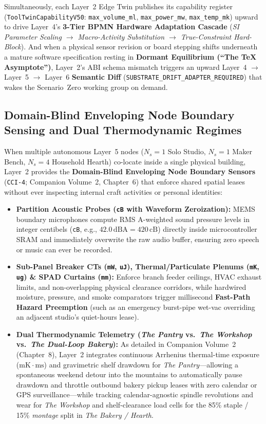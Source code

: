 Simultaneously, each Layer~2 Edge Twin publishes its capability register (\texttt{ToolTwinCapabilityV50}: \texttt{max\_volume\_ml}, \texttt{max\_power\_mw}, \texttt{max\_temp\_mk}) upward to drive Layer~4's \textbf{3-Tier BPMN Hardware Adaptation Cascade} (\textit{SI Parameter Scaling $\to$ Macro-Activity Substitution $\to$ True-Constraint Hard-Block}). And when a physical sensor revision or board stepping shifts underneath a mature software specification resting in \textbf{Dormant Equilibrium (``The \TeX{} Asymptote'')}, Layer~2's ABI schema mismatch triggers an upward Layer~4 $\to$ Layer~5 $\to$ Layer~6 \textbf{Semantic Diff} (\texttt{SUBSTRATE\_DRIFT\_ADAPTER\_REQUIRED}) that wakes the Scenario~Zero working group on demand.

\subsection{Domain-Blind Enveloping Node Boundary Sensing and Dual Thermodynamic Regimes}

When multiple autonomous Layer~5 nodes ($N_s=1$ Solo Studio, $N_s=1$ Maker Bench, $N_s=4$ Household Hearth) co-locate inside a single physical building, Layer~2 provides the \textbf{Domain-Blind Enveloping Node Boundary Sensors} (\texttt{CCI-4}; Companion Volume~2, Chapter~6) that enforce shared spatial leases without ever inspecting internal craft activities or personal identities:
\begin{itemize}
    \item \textbf{Partition Acoustic Probes (\texttt{cB} with Waveform Zeroization):} MEMS boundary microphones compute RMS A-weighted sound pressure levels in integer centibels (\texttt{cB}, e.g., $42.0\,\mathrm{dBA} = 420\,\mathrm{cB}$) directly inside microcontroller SRAM and immediately overwrite the raw audio buffer, ensuring zero speech or music can ever be recorded.
    \item \textbf{Sub-Panel Breaker CTs (\texttt{mW}, \texttt{uJ}), Thermal/Particulate Plenums (\texttt{mK}, \texttt{ug}) \& SPAD Curtains (\texttt{mm}):} Enforce branch feeder ceilings, HVAC exhaust limits, and non-overlapping physical clearance corridors, while hardwired moisture, pressure, and smoke comparators trigger millisecond \textbf{Fast-Path Hazard Preemption} (such as an emergency burst-pipe wet-vac overriding an adjacent studio's quiet-hours lease).
    \item \textbf{Dual Thermodynamic Telemetry (\textit{The Pantry} vs.\ \textit{The Workshop} vs.\ \textit{The Dual-Loop Bakery}):} As detailed in Companion Volume~2 (Chapter~8), Layer~2 integrates continuous Arrhenius thermal-time exposure ($\mathrm{mK\cdot ms}$) and gravimetric shelf drawdown for \textit{The Pantry}---allowing a spontaneous weekend detour into the mountains to automatically pause drawdown and throttle outbound bakery pickup leases with zero calendar or GPS surveillance---while tracking calendar-agnostic spindle revolutions and wear for \textit{The Workshop} and shelf-clearance load cells for the 85\% staple / 15\% \textit{montage} split in \textit{The Bakery / Hearth}.
\end{itemize}

